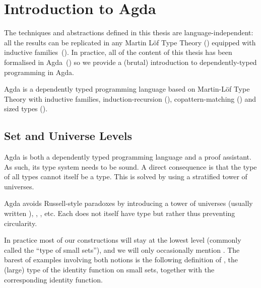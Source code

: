 \chapter{Introduction to Agda}
\label{introduction-agda}

The techniques and abstractions defined in this thesis are language-independent:
all the results can be replicated in any Martin L\"of Type Theory
(\citeyear{martin1982constructive}) equipped with inductive
families~(\cite{dybjer1994inductive}). In practice, all of the content of this
thesis has been formalised in Agda~(\cite{norell2009dependently}) so we provide
a (brutal) introduction to dependently-typed programming in Agda.

Agda is a dependently typed programming language based on Martin-L\"{o}f Type Theory
with inductive families, induction-recursion (\cite{Dybjer1999}), copattern-matching
(\cite{abelPientkaThibodeauSetzer:popl13}) and sized types
(\cite{DBLP:journals/corr/abs-1012-4896}).

\section{Set and Universe Levels}

Agda is both a dependently typed programming language and a proof assistant.
As such, its type system needs to be sound. A direct consequence is that the
type of all types cannot itself be a type. This is solved by using a stratified
tower of universes.

\begin{feature}
Agda avoids Russell-style paradoxes by introducing a tower of universes
 (usually written ), , , etc. Each
 does not itself have type  but rather  thus
preventing circularity.
\end{feature}

In practice most of our constructions will stay at the lowest level 
(commonly called the ``type of small sets''), and we will only occasionally
mention . The barest of examples involving both notions is the
following definition of , the (large) type of the identity function on
small sets, together with  the corresponding identity function.

\begin{minipage}{0.5\textwidth}
\end{minipage}\begin{minipage}{0.5\textwidth}
\end{minipage}

